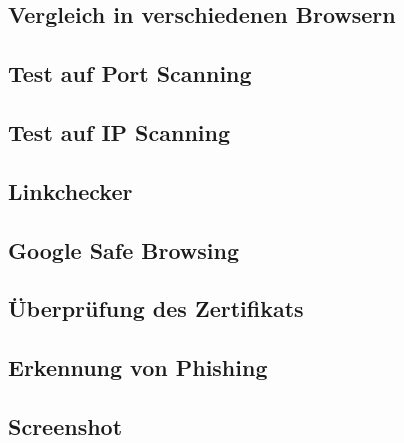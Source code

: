 \subsection{Vergleich in verschiedenen Browsern}


\subsection{Test auf Port Scanning}


\subsection{Test auf IP Scanning}


\subsection{Linkchecker}


\subsection{Google Safe Browsing}


\subsection{Überprüfung des Zertifikats}


\subsection{Erkennung von Phishing}


\subsection{Screenshot}

